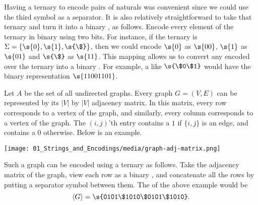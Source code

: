 \begin{flex}
\begin{example} \label{example:Binary-encoding-of-pairs-of-naturals}
Having a ternary  to encode pairs of naturals was convenient since we could use the third symbol as a separator. It is also relatively straightforward to take that ternary  and turn it into a binary , as follows. Encode every element of the ternary  in binary using two bits. For instance, if the ternary  is $\Sigma = \{\s{0},\s{1},\s{\$}\}$, then we could encode $\s{0}$ as $\s{00}$, $\s{1}$ as $\s{01}$ and $\s{\$}$ as $\s{11}$. This mapping allows us to convert any encoded  over the ternary  into a binary . For example, a  like $\s{\$0\$1}$ would have the binary representation $\s{11001101}$.
\end{example}

\begin{example} \label{example:Ternary-encoding-of-graphs}
Let $A$ be the set of all undirected graphs. Every graph $G=(V,E)$ can be represented by its $|V|$ by $|V|$ adjacency matrix. In this matrix, every row corresponds to a vertex of the graph, and similarly, every column corresponds to a vertex of the graph. The $(i,j)$'th entry contains a $1$ if $\{i, j\}$ is an edge, and contains a $0$ otherwise. Below is an example.
\begin{center}
    \texttt{[image: 01\_Strings\_and\_Encodings/media/graph-adj-matrix.png]}
\end{center}
Such a graph can be encoded using a ternary  as follows. Take the adjacency matrix of the graph, view each row as a binary , and concatenate all the rows by putting a separator symbol between them. The  of the above example would be
\[
\langle G \rangle = \s{0101\$1010\$0101\$1010}.
\]
\end{example}


\end{flex}
